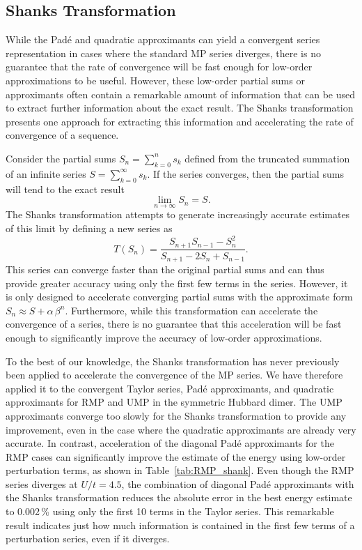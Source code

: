 \documentclass[aps,prb,reprint,noshowkeys,superscriptaddress]{revtex4-1}
\begin{document}
\subsection{Shanks Transformation}
\label{sec:Shanks}

While the Pad\'e and quadratic approximants can yield a convergent series representation
in cases where the standard MP series diverges, there is no guarantee that the rate of convergence
will be fast enough for low-order approximations to be useful.
However, these low-order partial sums or approximants often contain a remarkable amount of information
that can be used to extract further information about the exact result.
The Shanks transformation presents one approach for extracting this information
and accelerating the rate of convergence of a sequence.\cite{Shanks_1955,BenderBook}

Consider the partial sums
$S_n = \sum_{k=0}^{n} s_k$
defined from the truncated summation of an infinite series 
$S = \sum_{k=0}^{\infty} s_k$.
If the series converges, then the partial sums will tend to the exact result 
\begin{equation}
	\lim_{n \to \infty} S_n = S. 
\end{equation}
The Shanks transformation attempts to generate increasingly accurate estimates of this
limit by defining a new series as
\begin{equation}
    T(S_n) = \frac{S_{n+1} S_{n-1} - S_{n}^2}{S_{n+1} - 2 S_{n} + S_{n-1}}.
\end{equation}
This series can converge faster than the original partial sums and can thus provide greater
accuracy using only the first few terms in the series.
However, it is only designed to accelerate converging partial sums with 
the approximate form $S_n \approx S + \alpha\,\beta^n$.
Furthermore, while this transformation can accelerate the convergence of a series, 
there is no guarantee that this acceleration will be fast enough to significantly
improve the accuracy of low-order approximations.

To the best of our knowledge, the Shanks transformation has never previously been applied
to accelerate the convergence of the MP series.
We have therefore applied it to the convergent Taylor series, Pad\'e approximants, and quadratic
approximants for RMP and UMP in the symmetric Hubbard dimer. 
The UMP approximants converge too slowly for the Shanks transformation
to provide any improvement, even in the case where the quadratic approximants are already 
very accurate.
In contrast, acceleration of the diagonal Pad\'e approximants for the RMP cases 
can significantly improve the estimate of the energy using low-order perturbation terms, 
as shown in Table~\ref{tab:RMP_shank}.
Even though the RMP series diverges at $U/t = 4.5$, the combination
of diagonal Pad\'e approximants with the Shanks transformation reduces the absolute error in
the best energy estimate to 0.002\,\% using only the first 10 terms in the Taylor series.
This remarkable result indicates just how much information is contained in the first few
terms of a perturbation series, even if it diverges.
\end{document}
